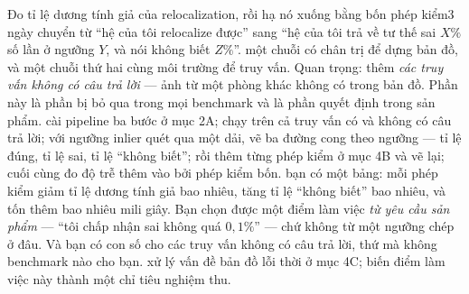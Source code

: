 \documentclass[../../vslam.tex]{subfiles}
\begin{document}
\begin{duan}{Đo tỉ lệ dương tính giả của relocalization, rồi hạ nó xuống bằng bốn phép kiểm}{3 ngày}
\dmt chuyển từ ``hệ của tôi relocalize được'' sang ``hệ của tôi trả về tư thế sai \(X\%\) số lần ở ngưỡng \(Y\), và nói không biết \(Z\%\)''.
\ddl một chuỗi có chân trị để dựng bản đồ, và một chuỗi thứ hai cùng môi trường để truy vấn. Quan trọng: thêm \emph{các truy vấn không có câu trả lời} --- ảnh từ một phòng khác không có trong bản đồ. Phần này là phần bị bỏ qua trong mọi benchmark và là phần quyết định trong sản phẩm.
\dbc cài pipeline ba bước ở mục 2A; chạy trên cả truy vấn có và không có câu trả lời; với ngưỡng inlier quét qua một dải, vẽ ba đường cong theo ngưỡng --- tỉ lệ đúng, tỉ lệ sai, tỉ lệ ``không biết''; rồi thêm từng phép kiểm ở mục 4B và vẽ lại; cuối cùng đo độ trễ thêm vào bởi phép kiểm bốn.
\dxk bạn có một bảng: mỗi phép kiểm giảm tỉ lệ dương tính giả bao nhiêu, tăng tỉ lệ ``không biết'' bao nhiêu, và tốn thêm bao nhiêu mili giây. Bạn chọn được một điểm làm việc \emph{từ yêu cầu sản phẩm} --- ``tôi chấp nhận sai không quá \(0{,}1\%\)'' --- chứ không từ một ngưỡng chép ở đâu. Và bạn có con số cho các truy vấn không có câu trả lời, thứ mà không benchmark nào cho bạn.
\dnv {} xử lý vấn đề bản đồ lỗi thời ở mục 4C;  biến điểm làm việc này thành một chỉ tiêu nghiệm thu.
\end{duan}
\end{document}
